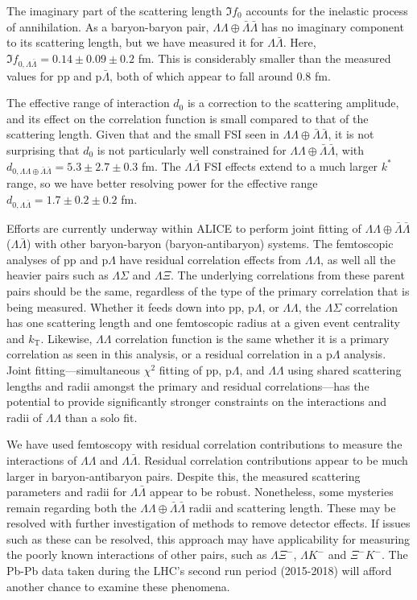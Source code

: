 The imaginary part of the scattering length $\Im f_0$ accounts for the inelastic process of annihilation.
As a baryon-baryon pair, $\Lambda\Lambda\oplus\bar{\Lambda}\bar{\Lambda}$ has no imaginary component to its scattering length, but we have measured it for $\Lambda\bar{\Lambda}$.
Here, $\Im f_{0,\Lambda\bar{\Lambda}} = 0.14 \pm 0.09 \pm 0.2$ fm.
This is considerably smaller than the measured values for p$\mathrm{p}$ and p$\bar{\Lambda}$, both of which appear to fall around 0.8 fm.

The effective range of interaction $d_0$ is a correction to the scattering amplitude, and its effect on the correlation function is small compared to that of the scattering length.
Given that and the small FSI seen in $\Lambda\Lambda\oplus\bar{\Lambda}\bar{\Lambda}$, it is not surprising that $d_0$ is not particularly well constrained for $\Lambda\Lambda\oplus\bar{\Lambda}\bar{\Lambda}$, with $d_{0,\Lambda\Lambda\oplus\bar{\Lambda}\bar{\Lambda}} = 5.3 \pm 2.7 \pm 0.3$ fm.
The $\Lambda\bar{\Lambda}$ FSI effects extend to a much larger $k^*$ range, so we have better resolving power for the effective range $d_{0,\Lambda\bar{\Lambda}} = 1.7 \pm 0.2 \pm 0.2$ fm.

Efforts are currently underway within ALICE to perform joint fitting of $\Lambda\Lambda\oplus\bar{\Lambda}\bar{\Lambda}$ ($\Lambda\bar{\Lambda}$) with other baryon-baryon (baryon-antibaryon) systems.
The femtoscopic analyses of pp and p$\Lambda$ have residual correlation effects from $\Lambda\Lambda$, as well all the heavier pairs such as $\Lambda\Sigma$ and $\Lambda\Xi$.
The underlying correlations from these parent pairs should be the same, regardless of the type of the primary correlation that is being measured.
Whether it feeds down into pp, p$\Lambda$, or $\Lambda\Lambda$, the $\Lambda\Sigma$ correlation has one scattering length and one femtoscopic radius at a given event centrality and $k_\mathrm{T}$.
Likewise, $\Lambda\Lambda$ correlation function is the same whether it is a primary correlation as seen in this analysis, or a residual correlation in a p$\Lambda$ analysis.
Joint fitting---simultaneous $\chi^2$ fitting of pp, p$\Lambda$, and $\Lambda\Lambda$ using shared scattering lengths and radii amongst the primary and residual correlations---has the potential to provide significantly stronger constraints on the interactions and radii of $\Lambda\Lambda$ than a solo fit.

We have used femtoscopy with residual correlation contributions to measure the interactions of $\Lambda\Lambda$ and $\Lambda\bar{\Lambda}$.
Residual correlation contributions appear to be much larger in baryon-antibaryon pairs.
Despite this, the measured scattering parameters and radii for $\Lambda\bar{\Lambda}$ appear to be robust.
Nonetheless, some mysteries remain regarding both the $\Lambda\Lambda\oplus\bar{\Lambda}\bar{\Lambda}$ radii and scattering length.
These may be resolved with further investigation of methods to remove detector effects.
If issues such as these can be resolved, this approach may have applicability for measuring the poorly known interactions of other pairs, such as $\Lambda\Xi^-$, $\Lambda K^-$ and $\Xi^-K^-$.
The Pb-Pb data taken during the LHC's second run period (2015-2018) will afford another chance to examine these phenomena.


